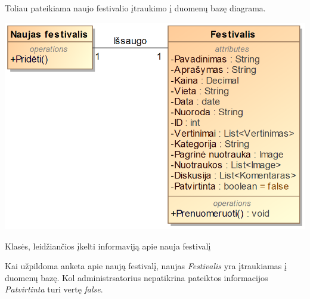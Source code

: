 ﻿\documentclass{VUMIFPSkursinis}
\begin{document}
Toliau pateikiama naujo festivalio įtraukimo į duomenų bazę diagrama.
\begin{center}
    \includegraphics[scale=0.5]{img/PSI3/naujas.PNG}
	\label{uml:20}
	\caption{Klasės, leidžiančios įkelti informaviją apie nauja festivalį}
\end{center}
Kai užpildoma anketa apie naują festivalį, naujas \textit{Festivalis} yra įtraukiamas į duomenų bazę. Kol administrsatorius nepatikrina pateiktos informacijos \textit{Patvirtinta} turi vertę \textit{false}.
\end{document}
